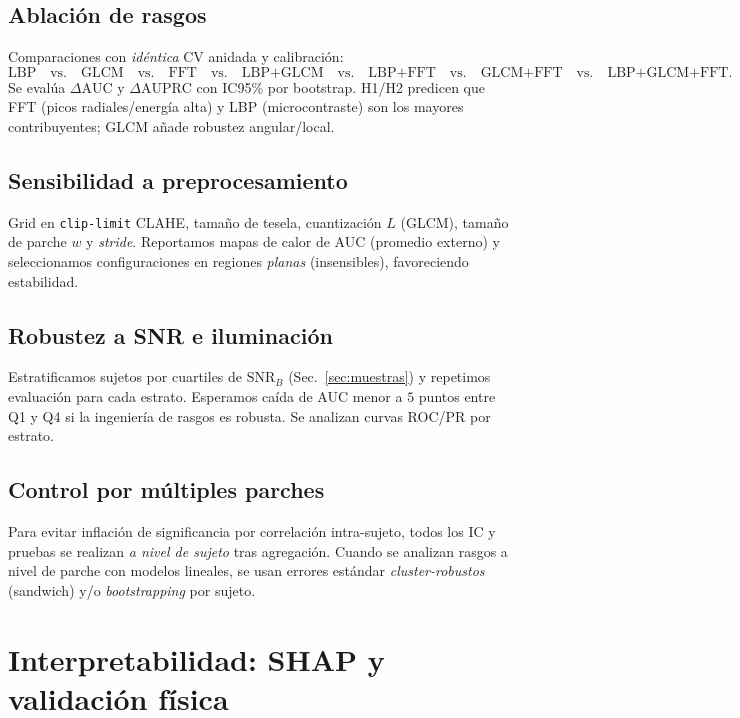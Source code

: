 \subsection{Ablación de rasgos}
Comparaciones con \emph{idéntica} CV anidada y calibración:
\[
\text{LBP}\quad\text{vs.}\quad\text{GLCM}\quad\text{vs.}\quad\text{FFT}\quad\text{vs.}\quad
\text{LBP+GLCM}\quad\text{vs.}\quad\text{LBP+FFT}\quad\text{vs.}\quad\text{GLCM+FFT}\quad\text{vs.}\quad\text{LBP+GLCM+FFT}.
\]
Se evalúa $\Delta\text{AUC}$ y $\Delta\text{AUPRC}$ con IC95\% por bootstrap. H1/H2 predicen que FFT (picos radiales/energía alta) y LBP (microcontraste) son los mayores contribuyentes; GLCM añade robustez angular/local.

\subsection{Sensibilidad a preprocesamiento}
Grid en \texttt{clip-limit} CLAHE, tamaño de tesela, cuantización $L$ (GLCM), tamaño de parche $w$ y \emph{stride}. Reportamos mapas de calor de AUC (promedio externo) y seleccionamos configuraciones en regiones \emph{planas} (insensibles), favoreciendo estabilidad.

\subsection{Robustez a SNR e iluminación}
Estratificamos sujetos por cuartiles de $\mathrm{SNR}_B$ (Sec.~\ref{sec:muestras}) y repetimos evaluación para cada estrato. Esperamos caída de AUC menor a $5$ puntos entre Q1 y Q4 si la ingeniería de rasgos es robusta. Se analizan curvas ROC/PR por estrato.

\subsection{Control por múltiples parches}
Para evitar inflación de significancia por correlación intra-sujeto, todos los IC y pruebas se realizan \emph{a nivel de sujeto} tras agregación. Cuando se analizan rasgos a nivel de parche con modelos lineales, se usan errores estándar \emph{cluster-robustos} (sandwich) y/o \emph{bootstrapping} por sujeto.

\section{Interpretabilidad: SHAP y validación física}
\label{sec:shap}

